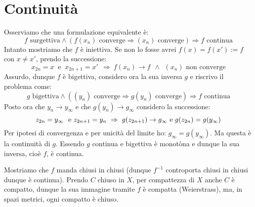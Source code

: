\section{Continuità}

 Osserviamo che una formulazione equivalente è:
$$ f\mbox{ surgettiva} \wedge \left( f(x_n)\mbox{ converge} \Rightarrow (x_n) \mbox{ converge} \right) \Rightarrow f \mbox{ continua} $$
Intanto mostriamo che $f$ è iniettiva. Se non lo fosse avrei $f(x)=f(x'):=f$ con $x\neq x'$, prendo la successione:
$$ x_{2n}=x\ \mbox{ e }\ x_{2n+1}=x'\ \ \Rightarrow\ f(x_n)\rightarrow f\ \  \wedge\ \ (x_n) \mbox{ non converge} $$
Assurdo, dunque $f$ è bigettiva, considero ora la sua inversa $g$ e riscrivo il problema come:
$$ g\mbox{ bigettiva} \wedge \left( (y_n)\mbox{ converge} \Rightarrow g(y_n) \mbox{ converge} \right) \Rightarrow f \mbox{ continua} $$
Posto ora che $y_n\rightarrow y_{\infty}$ e che $g(y_n)\rightarrow g_{\infty}$ considero la successione:
$$ z_{2n}=y_{\infty}\  \mbox{ e}\  z_{2n+1}=y_n\ \Rightarrow\  g(z_{2n+1})\rightarrow g_{\infty}\\ \mbox{ e}\  g(z_{2n})=g(y_{\infty}) $$
Per ipotesi di convergenza e per unicità del limite ho: $ g_{\infty}=g(y_{\infty})$. Ma questa è la continuità di $g$. Essendo $g$ continua e bigettiva è monotòna e dunque la sua inversa, cioè $f$, è continua.

Mostriamo che $f$ manda chiusi in chiusi (dunque $f^{-1}$ controporta chiusi in chiusi dunque è continua). Prendo $C$ chiuso in $X$, per compattezza di $X$ anche $C$ è compatto, dunque la sua immagine tramite $f$ è compatta (Weierstrass), ma, in spazi metrici, ogni compatto è chiuso. 

